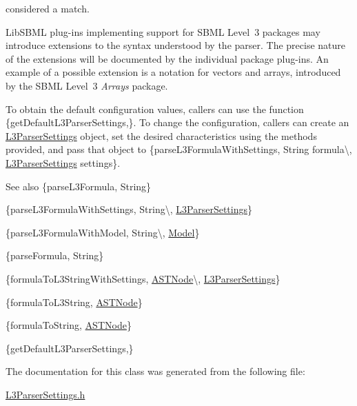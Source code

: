 \begin{DoxyItemize}
considered a match. \item Lib\+S\+B\+ML plug-\/ins implementing support for S\+B\+ML Level~3 packages may introduce extensions to the syntax understood by the parser. The precise nature of the extensions will be documented by the individual package plug-\/ins. An example of a possible extension is a notation for vectors and arrays, introduced by the S\+B\+ML Level~3 {\itshape Arrays} package.\end{DoxyItemize}
To obtain the default configuration values, callers can use the function \{get\+Default\+L3\+Parser\+Settings,\}. To change the configuration, callers can create an \hyperlink{class_l3_parser_settings}{L3\+Parser\+Settings} object, set the desired characteristics using the methods provided, and pass that object to \{parse\+L3\+Formula\+With\+Settings, String formula\textbackslash{}, \hyperlink{class_l3_parser_settings}{L3\+Parser\+Settings} settings\}.

\begin{DoxySeeAlso}{See also}
\{parse\+L3\+Formula, String\} 

\{parse\+L3\+Formula\+With\+Settings, String\textbackslash{}, \hyperlink{class_l3_parser_settings}{L3\+Parser\+Settings}\} 

\{parse\+L3\+Formula\+With\+Model, String\textbackslash{}, \hyperlink{class_model}{Model}\} 

\{parse\+Formula, String\} 

\{formula\+To\+L3\+String\+With\+Settings, \hyperlink{class_a_s_t_node}{A\+S\+T\+Node}\textbackslash{}, \hyperlink{class_l3_parser_settings}{L3\+Parser\+Settings}\} 

\{formula\+To\+L3\+String, \hyperlink{class_a_s_t_node}{A\+S\+T\+Node}\} 

\{formula\+To\+String, \hyperlink{class_a_s_t_node}{A\+S\+T\+Node}\} 

\{get\+Default\+L3\+Parser\+Settings,\} 
\end{DoxySeeAlso}


The documentation for this class was generated from the following file\+:\begin{DoxyCompactItemize}
\item 
\hyperlink{_l3_parser_settings_8h}{L3\+Parser\+Settings.\+h}\end{DoxyCompactItemize}
